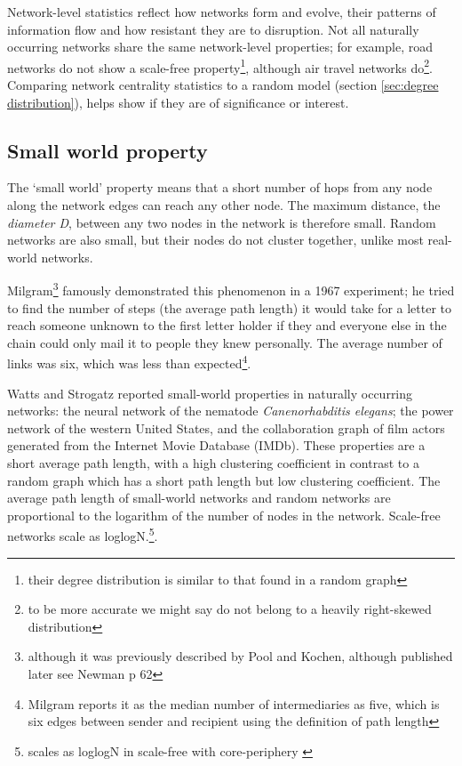 Network-level statistics reflect how networks form and evolve, their patterns of information flow and how resistant they are to disruption. Not all naturally occurring networks share the same network-level properties; for example, road networks do not show a scale-free property\cite{xie2007measuring}\footnote{their degree distribution is similar to that found in a random graph}, although air travel networks do\cite{boccaletti2006complex}\footnote{to be more accurate we might say do not belong to a heavily right-skewed distribution}. Comparing network centrality statistics to a random model  (section \ref{sec:degree distribution}), helps show if they are of significance or interest.








\subsection{Small world property}
\label{sec:Small world}
The `small world' property means that a short number of hops from any node along the network edges can reach any other node.  The maximum distance, the \textit{diameter D}, between any two nodes in the network is therefore small\cite{zhu2007getting}. Random networks are also small, but their nodes do not cluster together, unlike most real-world networks. 

 Milgram\cite{milgram1967small}\footnote{although it was previously described 
by Pool and Kochen, although published later \cite{de1978contacts}see Newman \cite{newman2018networks} p 62 } famously demonstrated this phenomenon in a 1967 experiment; he tried to find the number of steps (the average path length) it would take for a letter to reach someone unknown to the first letter holder if they and everyone else in the chain could only mail it to people they knew personally. The average number of links was six, which was less than expected\footnote{Milgram reports it as the median number of intermediaries as five, which is six edges between sender and recipient using the definition of path length}. 

Watts and Strogatz \cite{watts1998collective} reported small-world properties in naturally occurring networks: the neural network of the nematode \textit{Canenorhabditis elegans}; the power network of the western United States, and the collaboration graph of film actors generated from the Internet Movie Database (IMDb). These properties are a short average path length, with a high clustering coefficient in contrast to a random graph which has a short path length but low clustering coefficient. The average path length of small-world networks and random networks are proportional to the logarithm of the number of nodes in the network. Scale-free networks scale as loglogN\cite{cohen2003scale}.\footnote{scales as loglogN in scale-free with core-periphery \cite{boccaletti2006complex}}. 


